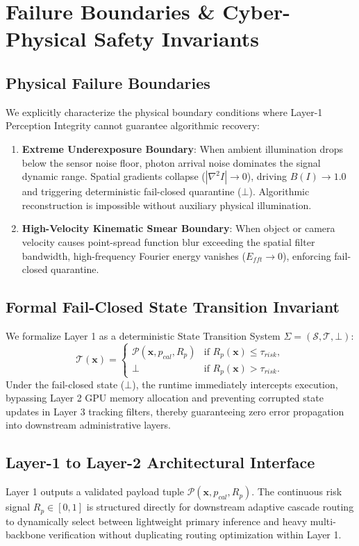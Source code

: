 \documentclass[conference]{IEEEtran}
\begin{document}
\section{Failure Boundaries \& Cyber-Physical Safety Invariants}
\subsection{Physical Failure Boundaries}
We explicitly characterize the physical boundary conditions where Layer-1 Perception Integrity cannot guarantee algorithmic recovery:
\begin{enumerate}
    \item \textbf{Extreme Underexposure Boundary}: When ambient illumination drops below the sensor noise floor, photon arrival noise dominates the signal dynamic range. Spatial gradients collapse ($|\nabla^2 I| \to 0$), driving $B(I) \to 1.0$ and triggering deterministic fail-closed quarantine ($\bot$). Algorithmic reconstruction is impossible without auxiliary physical illumination.
    \item \textbf{High-Velocity Kinematic Smear Boundary}: When object or camera velocity causes point-spread function blur exceeding the spatial filter bandwidth, high-frequency Fourier energy vanishes ($E_{fft} \to 0$), enforcing fail-closed quarantine.
\end{enumerate}

\subsection{Formal Fail-Closed State Transition Invariant}
We formalize Layer 1 as a deterministic State Transition System $\Sigma = (\mathcal{S}, \mathcal{T}, \bot)$:
\begin{equation}
\mathcal{T}(\mathbf{x}) = \begin{cases}
\mathcal{P}(\mathbf{x}, p_{cal}, R_p) & \text{if } R_p(\mathbf{x}) \le \tau_{risk}, \\
\bot & \text{if } R_p(\mathbf{x}) > \tau_{risk}.
\end{cases}
\end{equation}
Under the fail-closed state ($\bot$), the runtime immediately intercepts execution, bypassing Layer 2 GPU memory allocation and preventing corrupted state updates in Layer 3 tracking filters, thereby guaranteeing zero error propagation into downstream administrative layers.

\subsection{Layer-1 to Layer-2 Architectural Interface}
Layer 1 outputs a validated payload tuple $\mathcal{P}(\mathbf{x}, p_{cal}, R_p)$. The continuous risk signal $R_p \in [0, 1]$ is structured directly for downstream adaptive cascade routing to dynamically select between lightweight primary inference and heavy multi-backbone verification without duplicating routing optimization within Layer 1.
\end{document}
